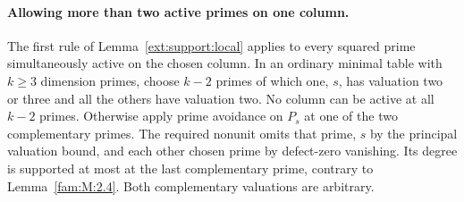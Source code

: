 \documentclass[11pt,a4paper]{article}
\numberwithin{equation}{section}
\theoremstyle{remark}
\begin{document}
\paragraph{Allowing more than two active primes on one column.}
The first rule of Lemma~\ref{ext:support:local} applies to every squared
prime simultaneously active on the chosen column. In an ordinary
minimal table with $k\ge3$ dimension primes, choose $k-2$ primes of
which one, $s$, has valuation two or three and all the others have
valuation two. No column can be active at all $k-2$ primes. Otherwise
apply prime avoidance on $P_s$ at one of the two complementary primes.
The required nonunit omits that prime, $s$ by the principal valuation
bound, and each other chosen prime by defect-zero vanishing. Its degree
is supported at most at the last complementary prime, contrary to
Lemma~\ref{fam:M:2.4}. Both complementary valuations are arbitrary.
\end{document}
